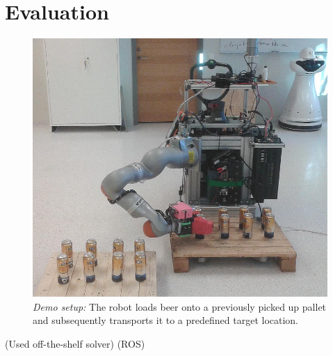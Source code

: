 \section{Evaluation}
\label{sec:eval}
%
\begin{figure}[t!]
\begin{center}
\includegraphics[width =1\linewidth]{figs/demo}
\caption{\textit{Demo setup:} The robot loads beer onto a previously picked up pallet and
  subsequently transports it to a predefined target location.}
\label{fig:demo_setup}
\vspace{-0.65cm}
\end{center}
\end{figure}
%
\cite{Guro15}(Used off-the-shelf solver)
\cite{Quig09}(ROS)